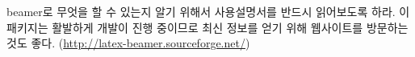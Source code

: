 beamer로 무엇을 할 수 있는지 알기 위해서 사용설명서를 반드시 읽어보도록 하라. 
이 패키지는 활발하게 개발이 진행 중이므로 최신 정보를 얻기 위해 웹사이트를 방문하는 것도 좋다.
(\href{http://latex-beamer.sourceforge.net/}{\ttfamily http://latex-beamer.sourceforge.net/})


